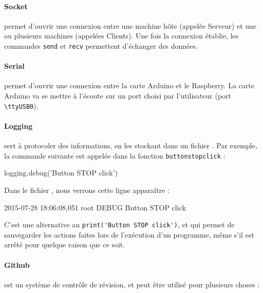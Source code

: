 \documentclass[12pt,a4paper]{report}
\begin{document}
\paragraph{Socket} permet d'ouvrir une connexion entre une machine hôte (appelée Serveur) et une ou plusieurs machines (appelées Clients). Une fois la connexion établie, les commandes \verb=send= et \verb=recv= permettent d'échanger des données.

\paragraph{Serial} permet d'ouvrir une connexion entre la carte Arduino et le Raspberry. La carte Arduino va se mettre à l'écoute sur un port choisi par l'utilisateur (port \verb=\ttyUSB0=). 

\paragraph{Logging} sert à protocoler des informations, en les stockant dans un fichier . Par exemple, la commande suivante est appelée dans la fonction \verb=buttonstopclick= :

\begin{verbatimtab}[3]
logging.debug('Button STOP click')
\end{verbatimtab}

Dans le fichier , nous verrons cette ligne apparaître :

\begin{verbatimtab}[3]
2015-07-28 18:06:08,051 root	DEBUG	Button STOP click
\end{verbatimtab}

C'est une alternative au \verb=print('Button STOP click')=, et qui permet de sauvegarder les actions faites lors de l'exécution d'un programme, même s'il est arrêté pour quelque raison que ce soit.

\paragraph{Github} est un système de contrôle de révision, et peut être utilisé pour plusieurs choses :
\end{document}
